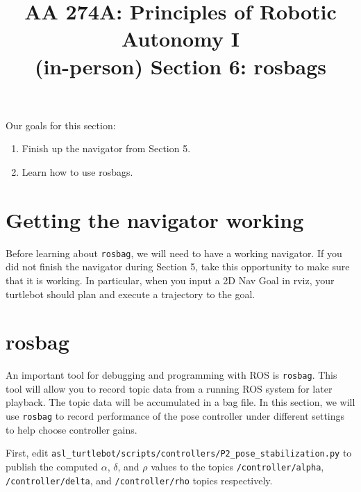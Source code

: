 \documentclass{article}
\title{AA 274A: Principles of Robotic Autonomy I \\(in-person) Section 6: rosbags}
\date{}
\begin{document}
\maketitle
\pagestyle{fancy}
\vspace{-1.25cm}
Our goals for this section: 
\begin{enumerate}
    \item Finish up the navigator from Section 5.
    \item Learn how to use rosbags.
\end{enumerate}


\section{Getting the navigator working}
Before learning about \texttt{rosbag}, we will need to have a working navigator. If you did not finish the navigator during Section 5, take this opportunity to make sure that it is working. In particular, when you input a 2D Nav Goal in rviz, your turtlebot should plan and execute a trajectory to the goal.

\section{rosbag}
An important tool for debugging and programming with ROS is \texttt{rosbag}. This tool will allow you to record topic data from a running ROS system for later playback. The topic data will be accumulated in a bag file. In this section, we will use \texttt{rosbag} to record performance of the pose controller under different settings to help choose controller gains.

First, edit \texttt{asl\_turtlebot/scripts/controllers/P2\_pose\_stabilization.py} to publish the computed $\alpha$, $\delta$, and $\rho$ values to the topics \texttt{/controller/alpha}, \texttt{/controller/delta}, and \texttt{/controller/rho} topics respectively. 
\end{document}
